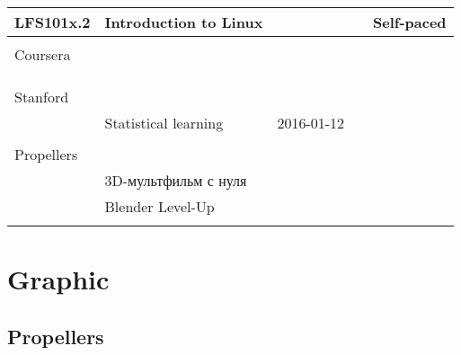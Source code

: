 \documentclass[a4paper,12pt]{article} %
\begin{document}
\begin{longtable}{|l|p{6cm}|c|c|l|}
	\hline
	LFS101x.2 & Introduction to Linux &  &  & Self-paced \\
	\hline
	&  &  &  &  \\
	\hline
	\multicolumn{5}{|l|}{Coursera}\\
	\hline
	&  &  &  &  \\
	\hline
	&  &  &  &  \\
	\hline
	&  &  &  &  \\
	\hline
	\multicolumn{5}{|l|}{Stanford}\\
	\hline
	& Statistical learning & 2016-01-12 &  &  \\
	\hline
	&  &  &  &  \\
	\hline
	\multicolumn{5}{|l|}{Propellers}\\
	\hline
	& 3D-мультфильм с нуля &  &  &  \\
	\hline
	& Blender Level-Up &  &  &  \\
	\hline
	&  &  &  &  \\
	\hline
\end{longtable}

\newpage
\section{Graphic}
\subsection{Propellers}
\end{document}
